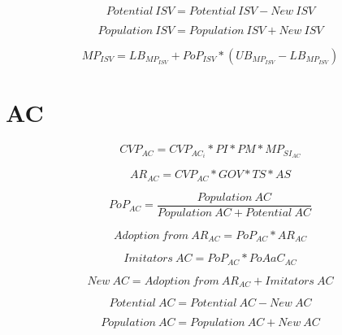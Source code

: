 \begin{equation}
	\mathit{Potential~ISV} = \mathit{Potential~ISV} - \mathit{New~ISV}
\end{equation}

\begin{equation}
	\mathit{Population~ISV} = \mathit{Population~ISV} + \mathit{New~ISV}
\end{equation}

\begin{equation}\label{eq:mp:isv}
	MP_{ISV} = LB_{MP_{ISV}} + PoP_{ISV} * (UB_{MP_{ISV}} - LB_{MP_{ISV}})
\end{equation}

\newpage
\section{AC}

\begin{equation}
		CVP_{AC} =  CVP_{AC_{i}} * PI * PM * MP_{SI_{AC}}
\end{equation}

\begin{equation}
		AR_{AC} = CVP_{AC} * GOV * TS * AS		
\end{equation}

\begin{equation}
	PoP_{AC} = \frac{\mathit{Population~AC}}{\mathit{Population~AC}+\mathit{Potential~AC}}
\end{equation}

\begin{equation}
	\mathit{Adoption~from~AR_{AC}} = PoP_{AC} * AR_{AC}
\end{equation}

\begin{equation}
	\mathit{Imitators~AC} = PoP_{AC} * PoAaC_{AC}
\end{equation}

\begin{equation}
	\mathit{New~AC} = \mathit{Adoption~from~AR_{AC}} + \mathit{Imitators~AC}
\end{equation}

\begin{equation}
	\mathit{Potential~AC} = \mathit{Potential~AC} - \mathit{New~AC}
\end{equation}

\begin{equation}
	\mathit{Population~AC} = \mathit{Population~AC} + \mathit{New~AC}
\end{equation}

